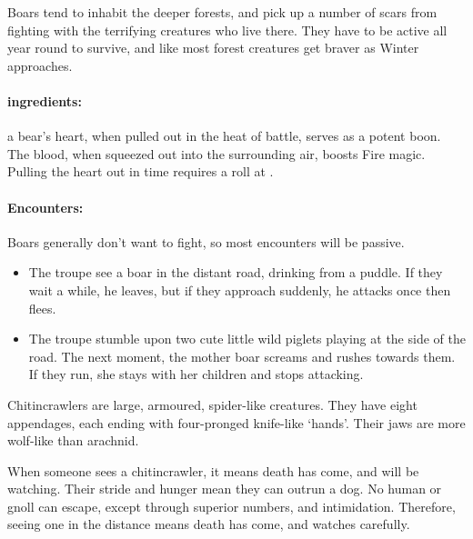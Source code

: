 \begin{multicols}{2}
\label{boar}

Boars tend to inhabit the deeper forests, and pick up a number of scars from fighting with the terrifying creatures who live there.
They have to be active all year round to survive, and like most forest creatures get braver as Winter approaches.

\boar

\paragraph{\Glspl{ingredient}:}
a bear's heart, when pulled out in the heat of battle, serves as a potent \gls{boon}.
The blood, when squeezed out into the surrounding air, boosts Fire magic.
Pulling the heart out in time requires a  roll at \tn[10].

\paragraph{Encounters:} Boars generally don't want to fight, so most encounters will be passive.

\begin{itemize}

  \item
  The troupe see a boar in the distant road, drinking from a puddle.
  If they wait a while, he leaves, but if they approach suddenly, he attacks once then flees.
  \item
  The troupe stumble upon two cute little wild piglets playing at the side of the road.
  The next moment, the mother boar screams and rushes towards them.
  If they run, she stays with her children and stops attacking.

\end{itemize}


\label{chitincrawler}

Chitincrawlers are large, armoured, spider-like creatures.
They have eight appendages, each ending with four-pronged knife-like `hands'.
Their jaws are more wolf-like than arachnid.

When someone sees a chitincrawler, it means death has come, and will be watching.
Their stride and hunger mean they can outrun a dog.
No human or gnoll can escape, except through superior numbers, and intimidation.
Therefore, seeing one in the distance means death has come, and watches carefully.


\end{multicols}
